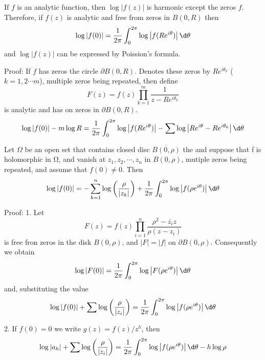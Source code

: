 \documentclass[12pt, oneside]{book}
\begin{document}
\begin{theorem}
    If $f$ is an analytic function, then $\log\left|f(z)\right|$ is harmonic except the zeros $f$. Therefore, if  $f(z)$ is analytic and free from zeros in $B(0,R)$ then
    $$\log\left|f(0)\right|
        =\frac1{2\pi}\int_0^{2\pi}\log\left|f(Re^{i\theta})\right|\d \theta$$
    and $\log\left|f(z)\right|$ can be expressed by Poission's formula.

    Proof:
    If $f$ has zeros the circle $\partial B(0,R)$. Denotes these zeros by $Re^{i\theta_k}$ ($k=1,2\cdots m$), multiple zeros being repeated, then define
    $$F(z)=f(z)\prod_{k=1}^m\frac{1}{z-Re^{i\theta_k}}$$
    is analytic and has on zeros in $\partial B(0,R)$.
    $$\log\left|f(0)\right|-m\log R=\frac1{2\pi}\int_0^{2\pi}\log\left|f(Re^{i\theta})\right|-\sum\log\left|Re^{i\theta}-Re^{i\theta_k}\right|\d \theta$$
\end{theorem}
\begin{theorem}
    Let $\Omega$ be an open set that contains closed disc $\overline{B(0, \rho )}$ the
    and suppose that f is holomorphic in Ω, and vanish at $z_1,z_2,\cdots,z_n$ in $B(0,\rho)$, mutiple zeros being repeated, and assume that $f(0)\neq 0$. Then
    $$
        \log\left|f(0)\right|
        =
        -\sum_{k=1}^n\log\left(\frac{\rho}{\left|z_k\right|}\right)
        +
        \frac1{2\pi}\int_0^{2\pi}\log\left|f(\rho e^{i\theta})\right|\d \theta
    $$

    Proof:
    1. Let
    $$
        F(z)=f(z)\prod_{i=1}^n\frac{\rho^2-\overline{z_i} z} {\rho(z-z_i)}
    $$
    is free fron zeros in the disk $B(0,\rho)$, and $\left|F\right|=\left|f\right|$ on $\partial B(0,\rho)$. Consequently we obtain
    $$
        \log\left|F(0)\right|
        =\frac1{2\pi}\int_0^{2\pi}\log\left|F(\rho e^{i\theta})\right|\d \theta
    $$
    and, substituting the value
    $$
        \log \left|f(0)\right|+\sum\log\left(\frac{\rho}{\left|z_i\right|}\right)
        =
        \frac1{2\pi}\int_0^{2\pi}\log\left|f(\rho e^{i\theta})\right|\d \theta$$

    2. If $f(0)=0$ we write $g(z)=f(z)/z^h$, then
    $$
        \log\left|a_h\right|+\sum\log\left(\frac{\rho}{\left|z_i\right|}\right)
        =
        \frac1{2\pi}\int_0^{2\pi}\log\left|f(\rho e^{i\theta})\right|\d \theta -h\log\rho
    $$
\end{theorem}
\end{document}

